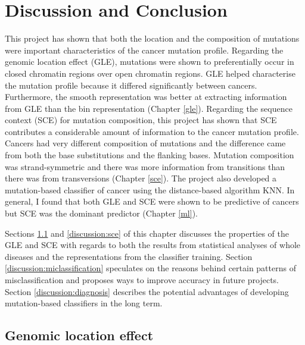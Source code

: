 \newpage
\chapter{Discussion and Conclusion}\label{discussion}

This project has shown that both the location and the composition of mutations were important characteristics of the cancer mutation profile. Regarding the genomic location effect (GLE), mutations were shown to preferentially occur in closed chromatin regions over open chromatin regions. GLE helped characterise the mutation profile because it differed significantly between cancers. Furthermore, the smooth representation was better at extracting information from GLE than the bin representation (Chapter \ref{gle}). Regarding the sequence context (SCE) for mutation composition, this project has shown that SCE contributes a considerable amount of information to the cancer mutation profile. Cancers had very different composition of mutations and the difference came from both the base substitutions and the flanking bases. Mutation composition was strand-symmetric and there was more information from transitions than there was from transversions (Chapter \ref{sce}). The project also developed a mutation-based classifier of cancer using the distance-based algorithm KNN. In general, I found that both GLE and SCE were shown to be predictive of cancers but SCE was the dominant predictor (Chapter \ref{ml}). 

Sections \ref{discussion:gle} and \ref{discussion:sce} of this chapter discusses the properties of the GLE and SCE with regards to both the results from statistical analyses of whole diseases and the representations from the classifier training. Section \ref{discussion:miclassification} speculates on the reasons behind certain patterns of misclassification and proposes ways to improve accuracy in future projects. Section \ref{discussion:diagnosis} describes the potential advantages of developing mutation-based classifiers in the long term.

\section{Genomic location effect}\label{discussion:gle}
